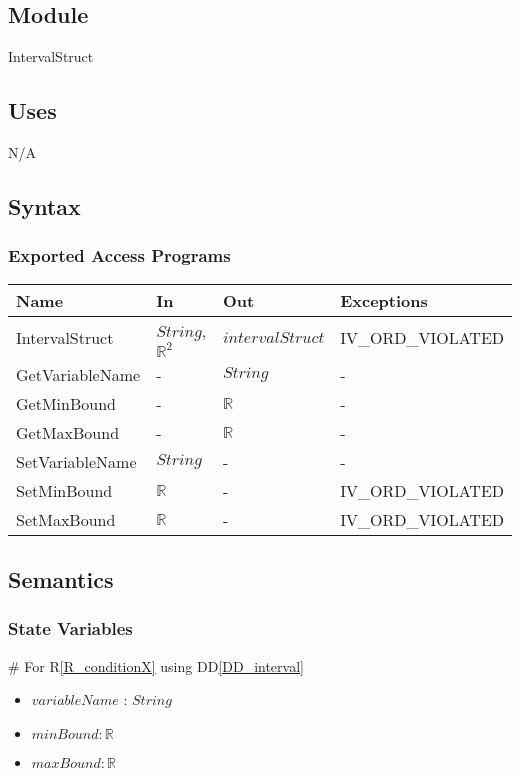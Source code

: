 \documentclass[12pt, titlepage]{article}
\newcommand{\rref}[1]{R\ref{#1}}
\newcommand{\ddref}[1]{DD\ref{#1}}
\begin{document}
\subsection{Module}

IntervalStruct

\subsection{Uses}

N/A

\subsection{Syntax}

\subsubsection{Exported Access Programs}

\begin{center}
	\begin{tabular}{p{3cm} p{3cm} p{3cm} p{5cm}}
		\hline
		\textbf{Name} & \textbf{In} & \textbf{Out} & \textbf{Exceptions} \\
		\hline		
		IntervalStruct & $String$, $\mathbb{R}^2$ & $intervalStruct$ & 
		IV\_ORD\_VIOLATED \\
		GetVariableName & - & $String$ & - \\
		GetMinBound & - & $\mathbb{R}$ & - \\
		GetMaxBound & - & $\mathbb{R}$ & - \\
		SetVariableName & $String$ & - & - \\
		SetMinBound & $\mathbb{R}$ & - & IV\_ORD\_VIOLATED \\
		SetMaxBound & $\mathbb{R}$ & - & IV\_ORD\_VIOLATED \\
		\hline
	\end{tabular}
\end{center}

\subsection{Semantics}

\subsubsection{State Variables}

\# For \rref{R_conditionX} using \ddref{DD_interval}
\begin{itemize}
	\item $variableName$ : $String$
	\item $minBound : \mathbb{R}$
	\item $maxBound : \mathbb{R}$
\end{itemize}
\end{document}
